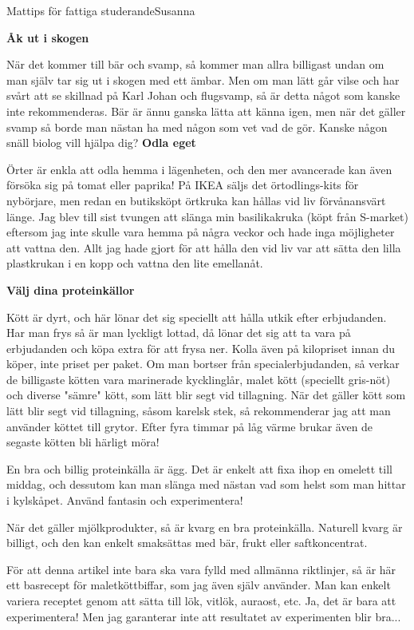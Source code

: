 \documentclass{spektraklet}
\begin{document}
\begin{artikel}{Mattips för fattiga studerande}{Susanna}
\begin{twocolumns}

\textbf{Åk ut i skogen}

När det kommer till bär och svamp, så kommer man allra billigast undan om man själv tar sig ut i skogen med ett ämbar. Men om man lätt går vilse och har svårt att se skillnad på Karl Johan och flugsvamp, så är detta något som kanske inte rekommenderas. Bär är ännu ganska lätta att känna igen, men när det gäller svamp så borde man nästan ha med någon som vet vad de gör. Kanske någon snäll biolog vill hjälpa dig?
\textbf{Odla eget}

Örter är enkla att odla hemma i lägenheten, och den mer avancerade kan även försöka sig på tomat eller paprika! På IKEA säljs det örtodlings-kits för nybörjare, men redan en butiksköpt örtkruka kan hållas vid liv förvånansvärt länge. Jag blev till sist tvungen att slänga min basilikakruka (köpt från S-market) eftersom jag inte skulle vara hemma på några veckor och hade inga möjligheter att vattna den. Allt jag hade gjort för att hålla den vid liv var att sätta den lilla plastkrukan i en kopp och vattna den lite emellanåt.

\textbf{Välj dina proteinkällor}

Kött är dyrt, och här lönar det sig speciellt att hålla utkik efter erbjudanden. Har man frys så är man lyckligt lottad, då lönar det sig att ta vara på erbjudanden och köpa extra för att frysa ner. Kolla även på kilopriset innan du köper, inte priset per paket. Om man bortser från specialerbjudanden, så verkar de billigaste kötten vara marinerade kycklinglår, malet kött (speciellt gris-nöt) och diverse "sämre" kött, som lätt blir segt vid tillagning. När det gäller kött som lätt blir segt vid tillagning, såsom karelsk stek, så rekommenderar jag att man använder köttet till grytor. Efter fyra timmar på låg värme brukar även de segaste kötten bli härligt möra!

En bra och billig proteinkälla är ägg. Det är enkelt att fixa ihop en omelett till middag, och dessutom kan man slänga med nästan vad som helst som man hittar i kylskåpet. Använd fantasin och experimentera!

När det gäller mjölkprodukter, så är kvarg en bra proteinkälla. Naturell kvarg är billigt, och den kan enkelt smaksättas med bär, frukt eller saftkoncentrat.

För att denna artikel inte bara ska vara fylld med allmänna riktlinjer, så är här ett basrecept för maletköttbiffar, som jag även själv använder. Man kan enkelt variera receptet genom att sätta till lök, vitlök, auraost, etc. Ja, det är bara att experimentera! Men jag garanterar inte att resultatet av experimenten blir bra...



\end{twocolumns}
\end{artikel}
\end{document}
